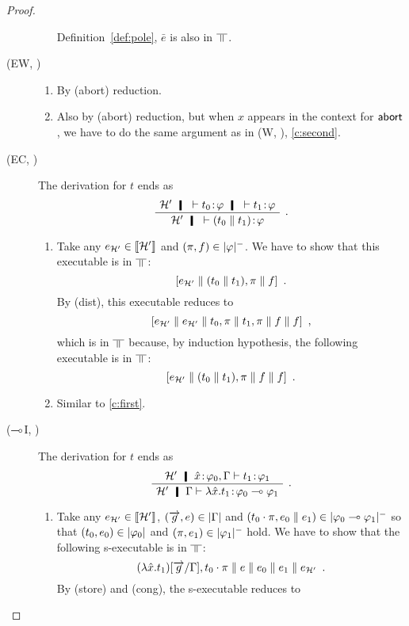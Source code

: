 \begin{proof}
\begin{description}
\begin{enumerate}[label=\textit{(\arabic{*})}]
	      Definition~\ref{def:pole},
	      $\bar e$ is also in $\bbot$.
	\end{enumerate}
   \item[(EW, \textminus)]
	\begin{enumerate}[label=\textit{(\arabic{*})}]
	 \item  By (abort) reduction.
	 \item Also by (abort) reduction, but when $x$ appears in the
	       context for $\mathsf{abort\,}$, we have to do the same argument as
	       in (W, \textminus), \ref{c:second}.
	\end{enumerate}
   \item[(EC, \textminus)]
	The derivation for $t$ ends as
	\[
	 \aseq{\hyp'}{\tj{t_0}{\phi}\hmid \tr\tj{t_1}{\phi}}
	\useq{\hyp'}{\tj{(t_0\conc t_1)}{\phi}}
	\DisplayProof\enspace.
	\]
	\begin{enumerate}[label=\textit{(\arabic{*})}]
	 \item Take any $e_{\mathcal H'}\in \llbracket{\mathcal H'}\rrbracket$ and
	       $(\pi,f)\in|{\varphi}|^-$.
	       We have to show that this executable is in $\bbot$:
	       \[
	       [e_{\mathcal H'}\parallel (t_0\parallel t_1), \pi\parallel f]\enspace.
	       \]
	       By (dist), this executable reduces to
	       \[
	       [e_{\mathcal H'}\parallel e_{\mathcal H'}\parallel
	       t_0,\pi \parallel t_1, \pi\parallel f\parallel f]\enspace,
	       \]
	       which is in $\bbot$ because, by induction hypothesis, the
	       following executable is in $\bbot$:
	       \[
	       [e_{\mathcal H'}\parallel
	       (t_0\parallel t_1), \pi\parallel f\parallel f]\enspace.
	       \]
	 \item Similar to \ref{c:first}.
	\end{enumerate}
   \item[($\multimap$I, \textminus)]
	The derivation for $t$ ends as
	\[
	\aseq{\hyp'\tj{\hat x}{\phi_0},\G}{\tj{t_1}{\phi_1}}
	\useq{\hyp'\G}{\tj{\lambda{\hat{x}}.t_1}{\phi_0\limp\phi_1}}
	\DisplayProof\enspace.
	\]
	\begin{enumerate}[label=\textit{(\arabic{*})}]
	 \item Take any
	       $e_{\mathcal H'}\in \llbracket{\mathcal H'}\rrbracket$,
	       $(\overrightarrow g, e)\in|{\Gamma}|$
	       and
	       $(t_0\cdot\pi,e_0\parallel e_1)\in|{\varphi_0\multimap\varphi_1}|^-$
	       so that $(t_0,e_0)\in|{\varphi_0}|$ and
	       $(\pi,e_1)\in|{\varphi_1}|^-$ hold.
	       We have to show that the following s-executable is in
	       $\bbot$:
	       \[
	       (\lambda\hat x.t_1)[\overrightarrow g/\Gamma],
	       t_0\cdot\pi\parallel e\parallel e_0\parallel e_1\parallel e_{\mathcal
	       H'}\enspace.
	       \]
	       By (store) and (cong), the s-executable reduces to

\end{enumerate}
\end{description}
\end{proof}
